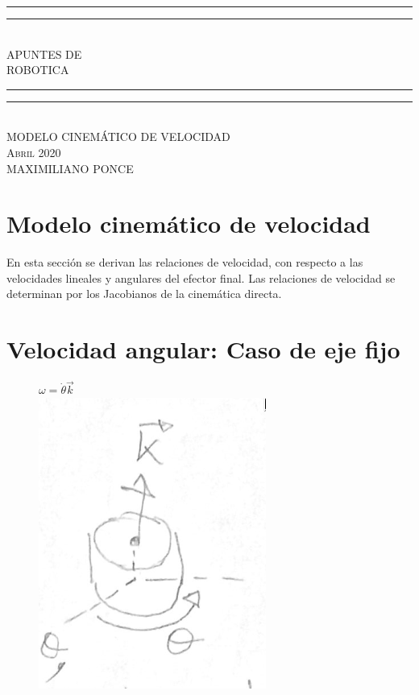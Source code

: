 \documentclass[10pt,a4paper]{article}
\newlength{\drop}
\begin{document}
\begin{titlepage}

\textheight
    \centering
    \vspace*{\baselineskip}
    \rule{\textwidth}{1.6pt}\vspace*{-\baselineskip}\vspace*{2pt}
    \rule{\textwidth}{0.6pt}\\[\baselineskip]
    {\LARGE APUNTES DE\\[0.2\baselineskip] ROBOTICA}\\[0.2\baselineskip]
    \rule{\textwidth}{0.4pt}\vspace*{-\baselineskip}\vspace{3.2pt}
    \rule{\textwidth}{1.6pt}\\[\baselineskip]
    \scshape
    MODELO CINEMÁTICO DE VELOCIDAD \\
    \vspace*{2\baselineskip}
    \vfill
    {\scshape Abril 2020} \\
    {\large MAXIMILIANO PONCE}\par

\end{titlepage}

\tableofcontents
\newpage

\section{Modelo cinemático de velocidad}
En esta sección se derivan las relaciones de velocidad, con respecto a las velocidades lineales y angulares del efector final. Las relaciones de velocidad se determinan por los Jacobianos de la cinemática directa.\\

\section{Velocidad angular: Caso de eje fijo}

\begin{figure}[h]
     \centering
     \begin{center}
		 $\omega = \dot{\theta} \vec{k}$ \\
     	\includegraphics[width=0.2\linewidth]{f1}
     \end{center}
\end{figure}
\end{document}
